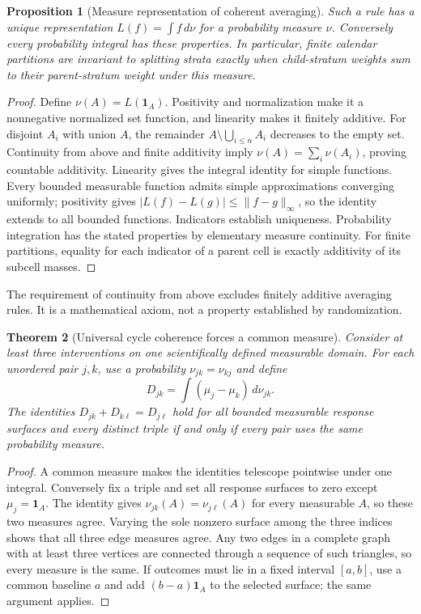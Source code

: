 \documentclass[11pt]{article}
\newtheorem{theorem}{Theorem}
\newtheorem{proposition}[theorem]{Proposition}
\theoremstyle{remark}\newtheorem{remark}[theorem]{Remark}
\newcommand{\Ind}{\mathbf 1}
\begin{document}
\begin{proposition}[Measure representation of coherent averaging]\label{measure}
Such a rule has a unique representation $L(f)=\int f\,d\nu$ for a probability measure $\nu$. Conversely every probability integral has these properties. In particular, finite calendar partitions are invariant to splitting strata exactly when child-stratum weights sum to their parent-stratum weight under this measure.
\end{proposition}
\begin{proof}
Define $\nu(A)=L(\Ind_A)$. Positivity and normalization make it a nonnegative normalized set function, and linearity makes it finitely additive. For disjoint $A_i$ with union $A$, the remainder $A\setminus\bigcup_{i\leq n}A_i$ decreases to the empty set. Continuity from above and finite additivity imply $\nu(A)=\sum_i\nu(A_i)$, proving countable additivity. Linearity gives the integral identity for simple functions. Every bounded measurable function admits simple approximations converging uniformly; positivity gives $|L(f)-L(g)|\leq\|f-g\|_\infty$, so the identity extends to all bounded functions. Indicators establish uniqueness. Probability integration has the stated properties by elementary measure continuity. For finite partitions, equality for each indicator of a parent cell is exactly additivity of its subcell masses.
\end{proof}

The requirement of continuity from above excludes finitely additive averaging rules. It is a mathematical axiom, not a property established by randomization.

\begin{theorem}[Universal cycle coherence forces a common measure]\label{cycle}
Consider at least three interventions on one scientifically defined measurable domain. For each unordered pair $j,k$, use a probability $\nu_{jk}=\nu_{kj}$ and define
\[
 D_{jk}=\int(\mu_j-\mu_k)\,d\nu_{jk}.
\]
The identities $D_{jk}+D_{k\ell}=D_{j\ell}$ hold for all bounded measurable response surfaces and every distinct triple if and only if every pair uses the same probability measure.
\end{theorem}
\begin{proof}
A common measure makes the identities telescope pointwise under one integral. Conversely fix a triple and set all response surfaces to zero except $\mu_j=\Ind_A$. The identity gives $\nu_{jk}(A)=\nu_{j\ell}(A)$ for every measurable $A$, so these two measures agree. Varying the sole nonzero surface among the three indices shows that all three edge measures agree. Any two edges in a complete graph with at least three vertices are connected through a sequence of such triangles, so every measure is the same. If outcomes must lie in a fixed interval $[a,b]$, use a common baseline $a$ and add $(b-a)\Ind_A$ to the selected surface; the same argument applies.
\end{proof}
\end{document}
